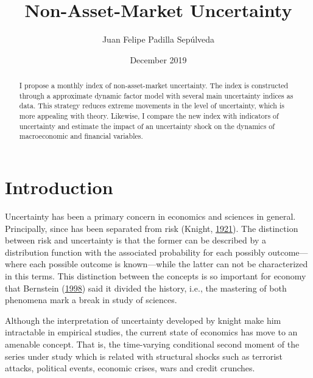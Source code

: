 \documentclass[12pt,twoside]{reedthesis}
\title{Non-Asset-Market Uncertainty}
\author{Juan Felipe Padilla Sepúlveda}
\date{December 2019}
\begin{document}
  \maketitle

\frontmatter %
\pagestyle{empty} %



  \hypersetup{linkcolor=black}
  \setcounter{tocdepth}{2}
  \tableofcontents

  \listoftables

  \listoffigures
  \begin{abstract}
    I propose a monthly index of non-asset-market uncertainty. The index is constructed through a approximate dynamic factor model with several main uncertainty indices as data. This strategy reduces extreme movements in the level of uncertainty, which is more appealing with theory. Likewise, I compare the new index with indicators of uncertainty and estimate the impact of an uncertainty shock on the dynamics of macroeconomic and financial variables.
  \end{abstract}

\mainmatter %
\pagestyle{fancyplain} %

\hypertarget{introduction}{%
\chapter*{Introduction}\label{introduction}}

Uncertainty has been a primary concern in economics and sciences in general. Principally, since has been separated from risk (Knight, \protect\hyperlink{ref-knight:1921}{1921}). The distinction between risk and uncertainty is that the former can be described by a distribution function with the associated probability for each possibly outcome---where each possible outcome is known---while the latter can not be characterized in this terms. This distinction between the concepts is so important for economy that Bernstein (\protect\hyperlink{ref-bernstein:1998}{1998}) said it divided the history, i.e., the mastering of both phenomena mark a break in study of sciences.

Although the interpretation of uncertainty developed by knight make him intractable in empirical studies, the current state of economics has move to an amenable concept. That is, the time-varying conditional second moment of the series under study which is related with structural shocks such as terrorist attacks, political events, economic crises, wars and credit crunches.
\end{document}
